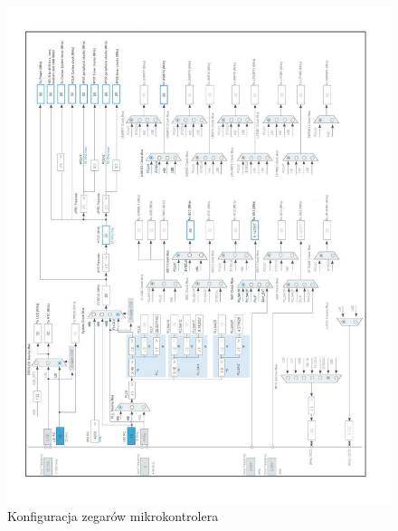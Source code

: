\documentclass[10pt, a4paper]{article}
\begin{document}
\begin{figure}[H]
\includegraphics[width=17cm]{figures/zeg.jpg}
\caption{Konfiguracja zegarów mikrokontrolera}
\end{figure}
\end{document}
